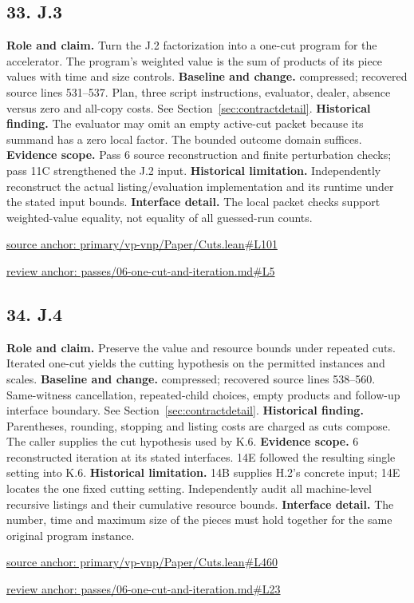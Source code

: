 \documentclass[11pt,letterpaper]{article}
\theoremstyle{definition}\newtheorem{definition}[theorem]{Definition}\newtheorem{example}[theorem]{Example}
\theoremstyle{remark}\newtheorem{remark}[theorem]{Remark}
\begin{document}
\subsection*{33. J.3}
\textbf{Role and claim.} Turn the J.2 factorization into a one-cut program for the accelerator. The program's weighted value is the sum of products of its piece values with time and size controls.
\textbf{Baseline and change.} compressed; recovered source lines 531--537. Plan, three script instructions, evaluator, dealer, absence versus zero and all-copy costs. See Section~\ref{sec:contractdetail}.
\textbf{Historical finding.} The evaluator may omit an empty active-cut packet because its summand has a zero local factor. The bounded outcome domain suffices.
\textbf{Evidence scope.} Pass 6 source reconstruction and finite perturbation checks; pass 11C strengthened the J.2 input.
\textbf{Historical limitation.} Independently reconstruct the actual listing/evaluation implementation and its runtime under the stated input bounds.
\textbf{Interface detail.} The local packet checks support weighted-value equality, not equality of all guessed-run counts.
\par\href{https://github.com/nousentllc/VP-VNP-Review/blob/8a7976933b6b2b4ffda1ad3a0dfb5fc6b6f023e8/primary/vp-vnp/Paper/Cuts.lean\#L101}{source anchor: primary/vp-vnp/Paper/Cuts.lean\#L101}
\par\href{https://github.com/nousentllc/VP-VNP-Review/blob/8a7976933b6b2b4ffda1ad3a0dfb5fc6b6f023e8/passes/06-one-cut-and-iteration.md\#L5}{review anchor: passes/06-one-cut-and-iteration.md\#L5}
\goodbreak
\subsection*{34. J.4}
\textbf{Role and claim.} Preserve the value and resource bounds under repeated cuts. Iterated one-cut yields the cutting hypothesis on the permitted instances and scales.
\textbf{Baseline and change.} compressed; recovered source lines 538--560. Same-witness cancellation, repeated-child choices, empty products and follow-up interface boundary. See Section~\ref{sec:contractdetail}.
\textbf{Historical finding.} Parentheses, rounding, stopping and listing costs are charged as cuts compose. The caller supplies the cut hypothesis used by K.6.
\textbf{Evidence scope.} 6 reconstructed iteration at its stated interfaces. 14E followed the resulting single setting into K.6.
\textbf{Historical limitation.} 14B supplies H.2’s concrete input; 14E locates the one fixed cutting setting. Independently audit all machine-level recursive listings and their cumulative resource bounds.
\textbf{Interface detail.} The number, time and maximum size of the pieces must hold together for the same original program instance.
\par\href{https://github.com/nousentllc/VP-VNP-Review/blob/8a7976933b6b2b4ffda1ad3a0dfb5fc6b6f023e8/primary/vp-vnp/Paper/Cuts.lean\#L460}{source anchor: primary/vp-vnp/Paper/Cuts.lean\#L460}
\par\href{https://github.com/nousentllc/VP-VNP-Review/blob/8a7976933b6b2b4ffda1ad3a0dfb5fc6b6f023e8/passes/06-one-cut-and-iteration.md\#L23}{review anchor: passes/06-one-cut-and-iteration.md\#L23}
\goodbreak
\end{document}
